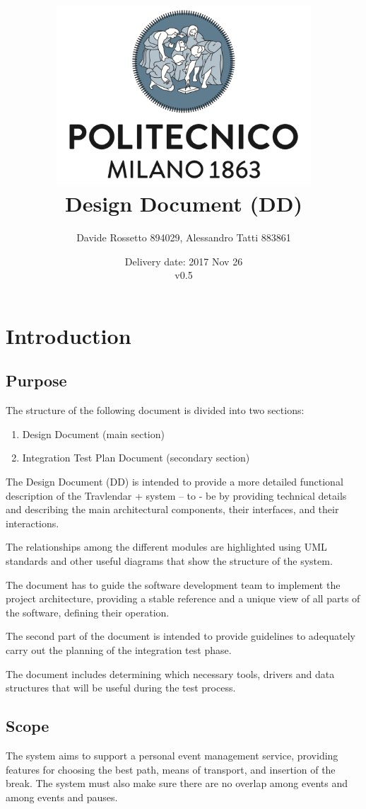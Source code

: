 \documentclass{article}
\title{ 
	\includegraphics[width=95mm]{img/PolimiLogo.png} \\
	\bigskip
	Design Document (DD)
}
\author{
	Davide Rossetto 894029, Alessandro Tatti 883861
}
\date{
	Delivery date: 2017 Nov 26\\
	\bigskip v0.5
}
\begin{document}
	
\maketitle
\newpage
\tableofcontents
\newpage
	
	
	\section{Introduction}
	

	
	\subsection{Purpose}
	The structure of the following document is divided into two sections:
	\begin{enumerate}
	\item Design Document (main section)
	\item Integration Test Plan Document (secondary section)
	\end{enumerate}

	\bigskip
	The Design Document (DD) is intended to provide a more detailed functional description of the Travlendar + system – to - be by providing technical details and describing the main architectural components, their interfaces, and their interactions.
	
	The relationships among the different modules are highlighted using UML standards and other useful diagrams that show the structure of the system.
	
	The document has to guide the software development team to implement the project architecture, providing a stable reference and a unique view of all parts of the software, defining their operation.

	\bigskip
	The second part of the document is intended to provide guidelines to adequately carry out the planning of the integration test phase.
	
	The document includes determining which necessary tools, drivers and data structures that will be useful during the test process.

	
	
	\subsection{Scope}
	The system aims to support a personal event management service, providing features for choosing the best path, means of transport, and insertion of the break. The system must also make sure there are no overlap among events and among events and pauses.
\end{document}
